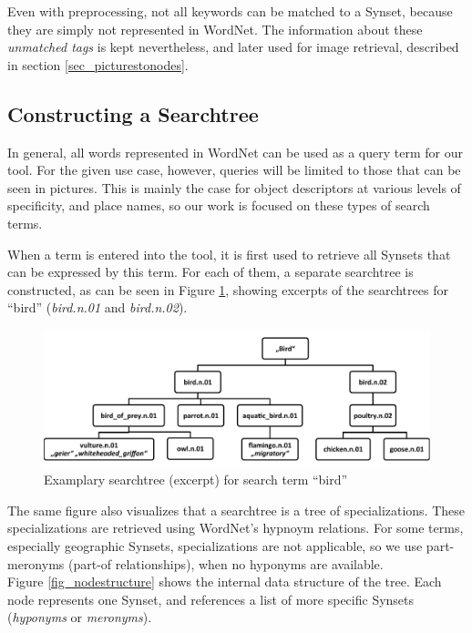 Even with preprocessing, not all keywords can be matched to a Synset, because they are simply not represented in WordNet. The information about these \emph{unmatched tags} is kept nevertheless, and later used for image retrieval, described in section \ref{sec_picturestonodes}.


\subsection{Constructing a Searchtree} 
\label{sec_searchtreeconstruction}
In general, all words represented in WordNet can be used as a query term for our tool.  For the given use case, however, queries will be limited to those that can be seen in pictures. This is mainly the case for object descriptors at various levels of specificity, and place names, so our work is focused on these types of search terms.

When a term is entered into the tool, it is first used to retrieve all Synsets that can be expressed by this term. For each of them, a separate searchtree is constructed, as can be seen in Figure \ref{fig_searchtree}, showing excerpts of the searchtrees for ``bird'' (\emph{bird.n.01} and \emph{bird.n.02}).

\begin{figure}[h]
\includegraphics[width=\textwidth]{images/searchtree.pdf}
\caption{Examplary searchtree (excerpt) for search term ``bird''}
\label{fig_searchtree}
\end{figure}

The same figure also visualizes that a searchtree is a tree of specializations. These specializations are retrieved using WordNet's hypnoym relations. For some terms, especially geographic Synsets, specializations are not applicable, so we use part-meronyms (part-of relationships), when no hyponyms are available.\\


Figure \ref{fig_nodestructure} shows the internal data structure of the tree. Each node represents one Synset, and references a list of more specific Synsets (\emph{hyponyms} or \emph{meronyms}). 

